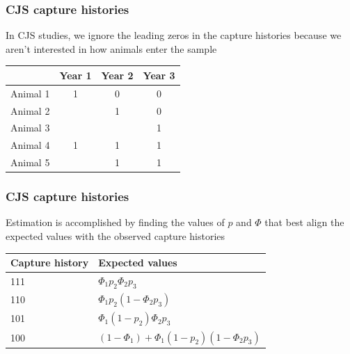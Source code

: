 \documentclass[color=usenames,dvipsnames]{beamer}\usepackage[]{graphicx}\usepackage[]{color}
\begin{document}



\begin{frame}
  \frametitle{CJS capture histories}
  In CJS studies, we ignore the leading zeros in the capture histories
  because we aren't interested in how animals enter the sample \\
  \vfill
  \vfill
  \begin{center}
    \small
    \begin{tabular}{lccc}
      \hline
      & Year 1 & Year 2 & Year 3 \\
      \hline
      Animal 1 & 1 & 0 & 0 \\
      Animal 2 &  & 1 & 0 \\
      Animal 3 &  &  & 1 \\
      Animal 4 & 1 & 1 & 1 \\
      Animal 5 &  & 1 & 1 \\
      \hline
    \end{tabular}
  \end{center}
\end{frame}



\begin{frame}
  \frametitle{CJS capture histories}
  \large
  Estimation is accomplished by finding the values of $p$ and $\Phi$
  that best align the expected values with the observed capture
  histories \\
  \vfill
  \begin{center}
    \begin{tabular}{ll}
      \hline
      Capture history & Expected values \\
      \hline
      111 & $\Phi_1p_2\Phi_2p_3$ \\ %
      110 & $\Phi_1p_2(1-\Phi_2p_3)$ \\ %
      101 & $\Phi_1(1-p_2)\Phi_2p_3$ \\ %
      100 & $(1-\Phi_1)+\Phi_1(1-p_2)(1-\Phi_2p_3)$ \\
      \hline
    \end{tabular}
  \end{center}
\end{frame}
\end{document}
